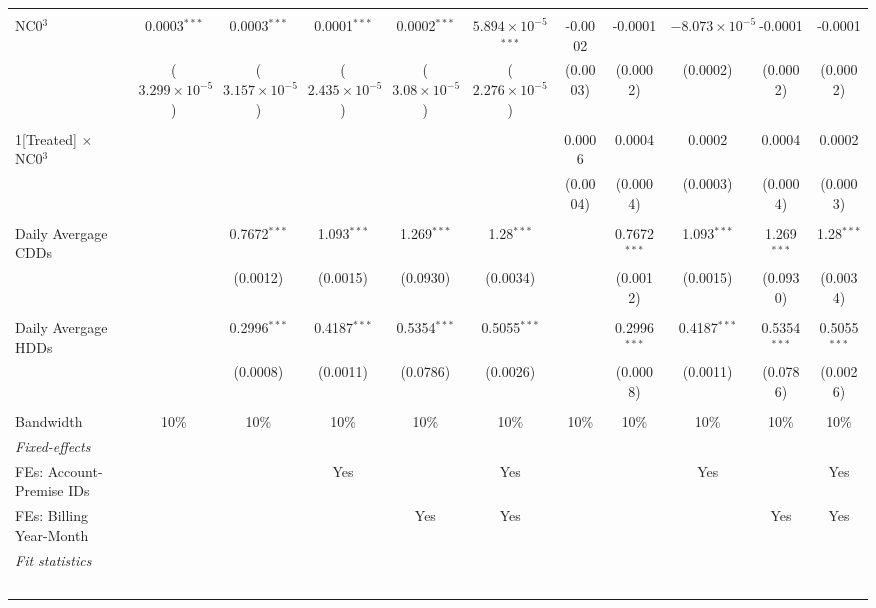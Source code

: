 \begin{table}[htbp]
\begin{adjustbox}{scale = 0.65}
\begin{tabular}{lcccccccccc}
&   &   &   &   &   &   &   &   &   &  \\
NC0$^3$&0.0003$^{***}$ & 0.0003$^{***}$ & 0.0001$^{***}$ & 0.0002$^{***}$ & $5.894\times 10^{-5}$$^{***}$ & -0.0002 & -0.0001 & $-8.073\times 10^{-5}$ & -0.0001 & -0.0001\\
  &($3.299\times 10^{-5}$) & ($3.157\times 10^{-5}$) & ($2.435\times 10^{-5}$) & ($3.08\times 10^{-5}$) & ($2.276\times 10^{-5}$) & (0.0003) & (0.0002) & (0.0002) & (0.0002) & (0.0002)\\
&   &   &   &   &   &   &   &   &   &  \\
1[Treated] $\times $ NC0$^3$&   &    &    &    &    & 0.0006 & 0.0004 & 0.0002 & 0.0004 & 0.0002\\
  &   &    &    &    &    & (0.0004) & (0.0004) & (0.0003) & (0.0004) & (0.0003)\\
&   &   &   &   &   &   &   &   &   &  \\
Daily Avergage CDDs&   & 0.7672$^{***}$ & 1.093$^{***}$ & 1.269$^{***}$ & 1.28$^{***}$ &    & 0.7672$^{***}$ & 1.093$^{***}$ & 1.269$^{***}$ & 1.28$^{***}$\\
  &   & (0.0012) & (0.0015) & (0.0930) & (0.0034) &    & (0.0012) & (0.0015) & (0.0930) & (0.0034)\\
&   &   &   &   &   &   &   &   &   &  \\
Daily Avergage HDDs&   & 0.2996$^{***}$ & 0.4187$^{***}$ & 0.5354$^{***}$ & 0.5055$^{***}$ &    & 0.2996$^{***}$ & 0.4187$^{***}$ & 0.5354$^{***}$ & 0.5055$^{***}$\\
  &   & (0.0008) & (0.0011) & (0.0786) & (0.0026) &    & (0.0008) & (0.0011) & (0.0786) & (0.0026)\\
&   &   &   &   &   &   &   &   &   &  \\
\midrule Bandwidth & 10\% & 10\% & 10\% & 10\% & 10\% & 10\% & 10\% & 10\% & 10\% & 10\%\\
\midrule
\emph{Fixed-effects}&   &   &   &   &   &   &   &   &   &  \\
FEs: Account-Premise IDs &  &  & Yes &  & Yes &  &  & Yes &  & Yes\\
FEs: Billing Year-Month &  &  &  & Yes & Yes &  &  &  & Yes & Yes\\
\midrule
\emph{Fit statistics}&  & & & & & & & & & \\
$$
\end{tabular}
\end{adjustbox}
\end{table}
